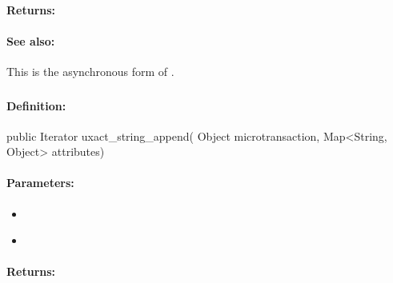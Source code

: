 \paragraph{Returns:}


\paragraph{See also:}  This is the asynchronous form of .

\pagebreak
\subsubsection{}
\label{api:java:uxact_string_append}


\paragraph{Definition:}
\begin{javacode}
public Iterator uxact_string_append(
        Object microtransaction,
        Map<String, Object> attributes)
\end{javacode}

\paragraph{Parameters:}
\begin{itemize}[noitemsep]
\item {}\\

\item {}\\

\end{itemize}

\paragraph{Returns:}


\pagebreak
\subsubsection{}
\label{api:java:cond_string_append}


